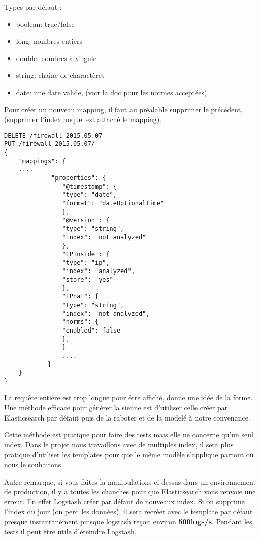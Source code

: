 Types par défaut :
\begin{itemize}
    \item   boolean: true/false
    \item   long: nombres entiers
    \item   double: nombres à virgule
    \item   string: chaine de charactères
    \item   date:   une date valide, (voir la doc pour les normes acceptées)
\end{itemize}

Pour créer un nouveau mapping, il faut au préalable supprimer le précédent, (supprimer 
l'index auquel est attaché le mapping).


\begin{lstlisting}[style=code,label={lst:mappingiput1},caption={Changer le mapping d'un index}]
DELETE /firewall-2015.05.07
PUT /firewall-2015.05.07/
{
    "mappings": {
    ....
             "properties": {
                "@timestamp": {
                "type": "date",
                "format": "dateOptionalTime"
                },
                "@version": {
                "type": "string",
                "index": "not_analyzed"
                },
                "IPinside": {
                "type": "ip",
                "index": "analyzed",
                "store": "yes"
                },
                "IPnat": {
                "type": "string",
                "index": "not_analyzed",
                "norms": {
                "enabled": false
                },
                }
                ....
            }
    }
}
\end{lstlisting}

La requête entière est trop longue pour être affiché, donne une idée de la forme.
Une méthode efficace pour générer la sienne est d'utiliser celle créer par Elasticsearch
par défaut puis de la raboter et de la modelé à notre convenance.

Cette méthode est pratique pour faire des tests mais elle ne concerne qu'un seul 
index. Dans le projet nous travaillons avec de multiples index, il sera plus pratique
d'utiliser les templates pour que le même modèle s'applique partout où nous le souhaitons.

Autre remarque, si vous faites la manipulations ci-dessus dans un environnement de 
production, il y a toutes les chanches pour que Elasticsearch vous renvoie une erreur.
En effet Logstash créer par défaut de nouveaux index. Si on supprime l'index du  
jour (on perd les données), il sera recréer avec le template par défaut presque 
instantanément puisque logstash reçoit environ \textbf{500logs/s}. Pendant les tests
il peut être utile d'éteindre Logstash.

